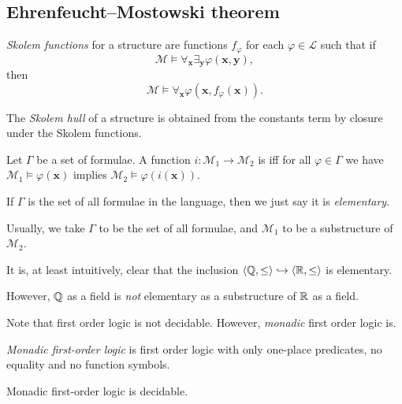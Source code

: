 \documentclass[a4paper]{article}
\begin{document}
\subsection{Ehrenfeucht--Mostowski theorem}
\begin{defi}
  \emph{Skolem functions} for a structure are functions $f_\varphi$ for each $\varphi \in \mathcal{L}$ such that if
  \[
    \mathcal{M} \vDash \forall_\mathbf{x} \exists_\mathbf{y} \varphi(\mathbf{x}, \mathbf{y}),
  \]
  then
  \[
    \mathcal{M} \vDash \forall_\mathbf{x} \varphi(\mathbf{x}, f_\varphi(\mathbf{x})).
  \]
\end{defi}

\begin{defi}
  The \emph{Skolem hull} of a structure is obtained from the constants term by closure under the Skolem functions.
\end{defi}

\begin{defi}
  Let $\Gamma$ be a set of formulae. A function $i: \mathcal{M}_1 \to \mathcal{M}_2$ is  iff for all $\varphi \in \Gamma$ we have $\mathcal{M}_1 \vDash \varphi(\mathbf{x})$ implies $\mathcal{M}_2 \vDash \varphi(i(\mathbf{x}))$.

  If $\Gamma$ is the set of all formulae in the language, then we just say it is \emph{elementary}.
\end{defi}
Usually, we take $\Gamma$ to be the set of all formulae, and $\mathcal{M}_1$ to be a substructure of $\mathcal{M}_2$.

\begin{eg}
  It is, at least intuitively, clear that the inclusion $\langle \mathbb{Q}, \leq\rangle \hookrightarrow \langle \mathbb{R}, \leq \rangle$ is elementary.

  However, $\mathbb{Q}$ as a field is \emph{not} elementary as a substructure of $\mathbb{R}$ as a field.
\end{eg}

Note that first order logic is not decidable. However, \emph{monadic} first order logic is.
\begin{defi}
  \emph{Monadic first-order logic} is first order logic with only one-place predicates, no equality and no function symbols.
\end{defi}

\begin{prop}
  Monadic first-order logic is decidable.
\end{prop}
\end{document}

